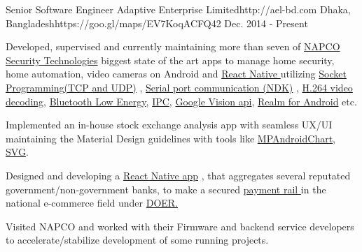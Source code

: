 

\begin{workentries}

\workentry
{Senior Software Engineer} %
{Adaptive Enterprise Limited}{http://ael-bd.com} %
{Dhaka, Bangladesh}{https://goo.gl/maps/EV7KoqACFQ42} %
{Dec. 2014 - Present} %
{
  \begin{workitems} %
    \item {Developed, supervised and currently maintaining more than seven of
    {\href{http://www.napcosecurity.com}{NAPCO Security Technologies}}
    biggest state of the art apps to manage home security, home automation, video cameras on Android and 
    {\href{https://facebook.github.io/react-native/}{React Native }}
    utilizing 
    {\href{https://www.geeksforgeeks.org/socket-programming-in-java/}{Socket Programming(TCP }}
    {\href{https://www.geeksforgeeks.org/working-udp-datagramsockets-java/}{and UDP)}}
    , 
    {\href{https://github.com/cepr/android-serialport-api/tree/master/android-serialport-api/project}{Serial port communication (NDK)}}
    , 
    {\href{https://ieeexplore.ieee.org/document/1410457}{H.264 video decoding}}, 
    {\href{https://en.wikipedia.org/wiki/Bluetooth_Low_Energy}{Bluetooth Low Energy}}, 
    {\href{https://developer.android.com/guide/components/aidl}{IPC}}, 
    {\href{https://developers.google.com/vision/}{Google Vision api}}, 
    {\href{https://realm.io}{Realm for Android}}
    etc.}
    \item {Implemented an in-house stock exchange analysis app with seamless UX/UI maintaining the Material Design guidelines with tools like
    {\href{https://github.com/PhilJay/MPAndroidChart}{MPAndroidChart}},
    {\href{https://www.sitepoint.com/svg-101-what-is-svg/}{SVG}.}
    }
    \item {Designed and developing a 
    {\href{https://facebook.github.io/react-native/}{React Native app}}
    , that aggregates several reputated government/non-government banks, to make a secured 
    {\href{https://www.paymentrails.com}{payment rail }}
    in the national 
    e-commerce field under 
    {\href{http://doer.com.bd}{DOER.}}
    }
    \item {Visited NAPCO and worked with their Firmware and backend service developers to accelerate/stabilize development of some running projects.}
  \end{workitems}
}


\end{workentries}
